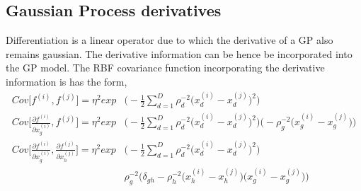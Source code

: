 \subsection{Gaussian Process derivatives}
Differentiation is a linear operator due to which the derivative of a GP also remains gaussian. The derivative information can be hence be incorporated into the GP model. The RBF covariance function incorporating the derivative information is has the form,
\begin{align*}
Cov\big[f^{(i)},f^{(j)}\big] = \eta^2 exp&\bigg(-\frac{1}{2}\sum_{d=1}^D \rho_d^{-2}\big(x_d^{(i)}-x_d^{(j)}\big)^2\bigg)\\
Cov\Bigg[\frac{\partial f^{(i)}}{\partial x_g^{(i)}},f^{(j)}\Bigg] = \eta^2 exp&\Bigg(-\frac{1}{2}\sum_{d=1}^{D}\rho_d^{-2}\big(x_d^{(i)}-x_d^{(j)}\big)^2\Bigg)\bigg(-\rho_g^{-2}\big(x_g^{(i)}-x_g^{(j)}\big)\bigg) \\
Cov\Bigg[\frac{\partial f^{(i)}}{\partial x_g^{(i)}},\frac{\partial f^{(j)}}{\partial x_h^{(j)}}\Bigg] = \eta^2 exp&\Bigg(-\frac{1}{2}\sum_{d=1}^{D}\rho_d^{-2}\big(x_d^{(i)}-x_d^{(j)}\big)^2\Bigg) \\ 
& \rho_g^{-2}\bigg(\delta_{gh}-\rho_h^{-2}\big(x_h^{(i)}-x_h^{(j)}\big)\big(x_g^{(i)}-x_g^{(j)}\big)\bigg)
\end{align*}

